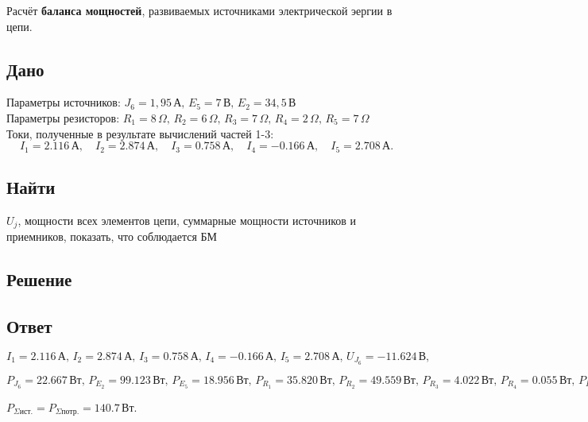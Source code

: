 Расчёт \textbf{баланса мощностей}, развиваемых источниками электрической эергии в цепи.

\subsection{Дано}
Параметры источников: \(J_6 = 1{,}95 \, \text{А}, \, E_5 = 7 \, \text{В}, \, E_2 = 34{,}5 \, \text{В} \) \\
Параметры резисторов: \(R_1 = 8 \, \Omega, \, R_2 = 6 \, \Omega, \, R_3 = 7 \, \Omega, \, R_4 = 2 \, \Omega, \, R_5 = 7 \, \Omega\) \\
Токи, полученные в результате вычислений частей 1-3:
\[
	I_1 = 2.116 \, \text{А}, \quad
	I_2 = 2.874 \, \text{А}, \quad
	I_3 = 0.758 \, \text{А}, \quad
	I_4 = -0.166 \, \text{А}, \quad
	I_5 = 2.708 \, \text{А}.
\]

\subsection{Найти}
$U_j$, мощности всех элементов цепи, суммарные мощности источников и приемников, показать, что соблюдается БМ

\subsection{Решение}


\subsection{Ответ}
$I_1 = 2.116 \, \text{А}, \, I_2 = 2.874 \, \text{А}, \, I_3 = 0.758 \, \text{А}, \, I_4 = -0.166 \, \text{А}, \, I_5 = 2.708 \, \text{А}, \, U_{J_6} = -11.624 \, \text{В},$

$P_{J_6} = 22.667 \, \text{Вт}, \, P_{E_2} = 99.123 \, \text{Вт}, \, P_{E_5} = 18.956 \, \text{Вт}, \, P_{R_1} = 35.820 \, \text{Вт}, \, P_{R_2} = 49.559 \, \text{Вт}, \, P_{R_3} = 4.022 \, \text{Вт}, \, P_{R_4} = 0.055 \, \text{Вт}, \, P_{R_5} = 51.333 \, \text{Вт},$

$P_{\Sigma \text{ист.}} = P_{\Sigma \text{потр.}} = 140.7 \, \text{Вт}$.
